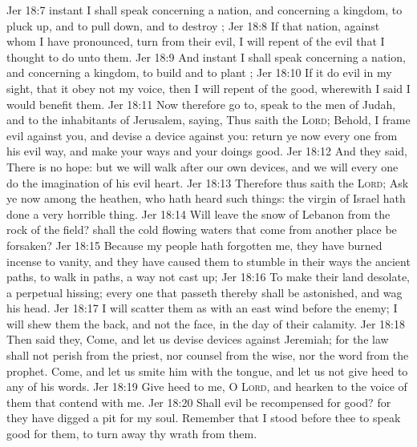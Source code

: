 \vs Jer 18:7  instant I shall speak concerning a nation, and concerning a kingdom, to pluck up, and to pull down, and to destroy ;
\vs Jer 18:8 If that nation, against whom I have pronounced, turn from their evil, I will repent of the evil that I thought to do unto them.
\vs Jer 18:9 And  instant I shall speak concerning a nation, and concerning a kingdom, to build and to plant ;
\vs Jer 18:10 If it do evil in my sight, that it obey not my voice, then I will repent of the good, wherewith I said I would benefit them.
\vs Jer 18:11 Now therefore go to, speak to the men of Judah, and to the inhabitants of Jerusalem, saying, Thus saith the \textsc{Lord}; Behold, I frame evil against you, and devise a device against you: return ye now every one from his evil way, and make your ways and your doings good.
\vs Jer 18:12 And they said, There is no hope: but we will walk after our own devices, and we will every one do the imagination of his evil heart.
\vs Jer 18:13 Therefore thus saith the \textsc{Lord}; Ask ye now among the heathen, who hath heard such things: the virgin of Israel hath done a very horrible thing.
\vs Jer 18:14 Will  leave the snow of Lebanon  from the rock of the field?  shall the cold flowing waters that come from another place be forsaken?
\vs Jer 18:15 Because my people hath forgotten me, they have burned incense to vanity, and they have caused them to stumble in their ways  the ancient paths, to walk in paths,  a way not cast up;
\vs Jer 18:16 To make their land desolate,  a perpetual hissing; every one that passeth thereby shall be astonished, and wag his head.
\vs Jer 18:17 I will scatter them as with an east wind before the enemy; I will shew them the back, and not the face, in the day of their calamity.
\vs Jer 18:18 Then said they, Come, and let us devise devices against Jeremiah; for the law shall not perish from the priest, nor counsel from the wise, nor the word from the prophet. Come, and let us smite him with the tongue, and let us not give heed to any of his words.
\vs Jer 18:19 Give heed to me, O \textsc{Lord}, and hearken to the voice of them that contend with me.
\vs Jer 18:20 Shall evil be recompensed for good? for they have digged a pit for my soul. Remember that I stood before thee to speak good for them,  to turn away thy wrath from them.
